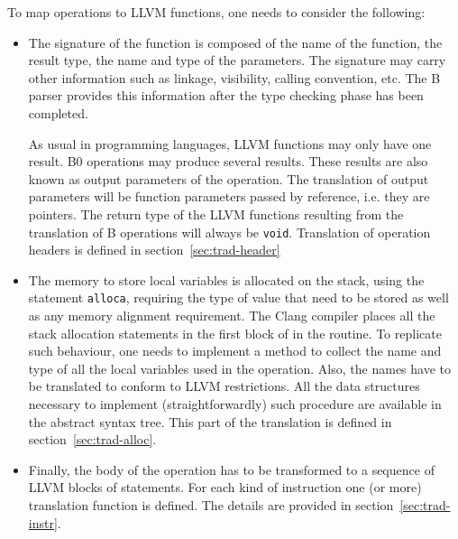 \documentclass{article}
\begin{document}
To map operations to LLVM functions, one needs to consider the
following:
\begin{itemize}
\item The signature of the function is composed of the name of the
  function, the result type, the name and type of the parameters. The
  signature may carry other information such as linkage, visibility,
  calling convention, etc. The B parser provides this information after
  the type checking phase has been completed.

  As usual in programming languages, LLVM functions may only have one
  result. B0 operations may produce several results. These results are
  also known as output parameters of the operation. The translation of
  output parameters will be function parameters passed by reference,
  i.e. they are pointers. The return type of the LLVM functions
  resulting from the translation of B operations will always be
  \texttt{void}. Translation of operation headers is defined in
  section~\ref{sec:trad-header}

\item The memory to store local variables is allocated on the stack,
  using the statement \verb+alloca+, requiring the type of value that
  need to be stored as well as any memory alignment requirement. The
  Clang compiler places all the stack allocation statements in the
  first block of in the routine. To replicate such behaviour, one
  needs to implement a method to collect the name and type of all the
  local variables used in the operation. Also, the names have to be
  translated to conform to LLVM restrictions. All the data structures
  necessary to implement (straightforwardly) such procedure are
  available in the abstract syntax tree. This part of the translation 
  is defined in section~\ref{sec:trad-alloc}.
  
\item Finally, the body of the operation has to be transformed to a
  sequence of LLVM blocks of statements. For each kind of instruction
  one (or more) translation function is defined. The details are provided
  in section~\ref{sec:trad-instr}.

\end{itemize}
\end{document}
